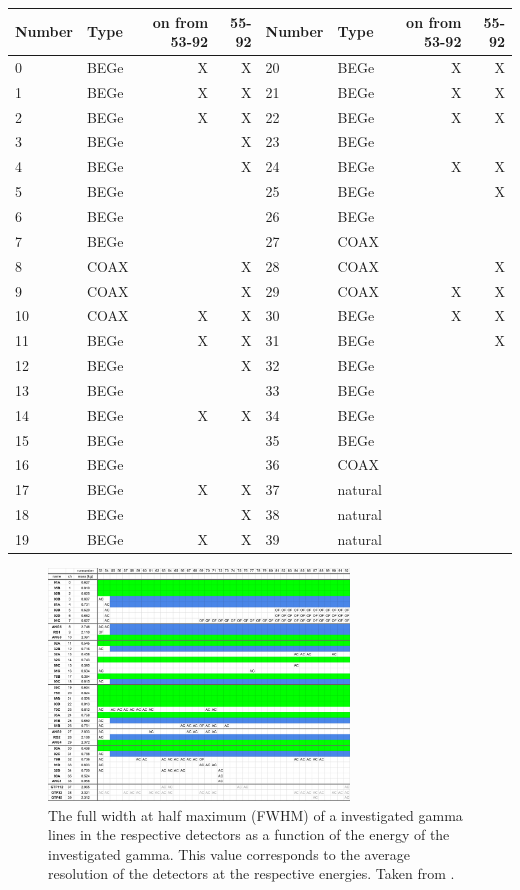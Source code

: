 \begin{table}
	\begin{tabular}{|l|l|r|r||l|l|r|r|}
		\hline
		Number & Type & on from 53-92 & 55-92 & Number & Type & on from 53-92 & 55-92 \\
		\hline
		0 & BEGe & X & X & 20 & BEGe & X & X \\
		\hline
		1 & BEGe & X & X & 21 & BEGe & X & X \\
		\hline
		2 & BEGe & X & X & 22 & BEGe & X & X \\
		\hline
		3 & BEGe &  & X & 23 & BEGe &  &  \\
		\hline
		4 & BEGe &  & X & 24 & BEGe & X & X \\
		\hline
		5 & BEGe &  &  & 25 & BEGe &  & X \\
		\hline
		6 & BEGe &  &  & 26 & BEGe &  &  \\
		\hline
		7 & BEGe &  &  & 27 & COAX &  &  \\
		\hline
		8 & COAX &  & X & 28 & COAX &  & X \\
		\hline
		9 & COAX &  & X & 29 & COAX & X & X \\
		\hline
		10 & COAX & X & X & 30 & BEGe & X & X \\
		\hline
		11 & BEGe & X & X & 31 & BEGe &  & X \\
		\hline
		12 & BEGe &  & X & 32 & BEGe &  &  \\
		\hline
		13 & BEGe &  &  & 33 & BEGe &  &  \\
		\hline
		14 & BEGe & X & X & 34 & BEGe & &  \\
		\hline
		15 & BEGe &  &  & 35 & BEGe &  &  \\
		\hline
		16 & BEGe &  &  & 36 & COAX &  &  \\
		\hline
		17 & BEGe & X & X & 37 & natural &  &  \\
		\hline
		18 & BEGe &  & X & 38 & natural &  &  \\
		\hline
		19 & BEGe & X & X & 39 & natural &  &  \\
		\hline
	\end{tabular}
\end{table}

\begin{figure}
	\centering
	\ifmakefigures%
	\includegraphics[width=80mm]{./Bilder/runOverview.png}
	\fi%
	\caption{
		The full width at half maximum (FWHM) of a investigated gamma lines in the respective detectors as a function of the energy of the investigated gamma.
		This value corresponds to the average resolution of the detectors at the respective energies.
		Taken from \cite{agostini_background_2017}.
	}
	\label{fig:Aufloesung}
\end{figure}

